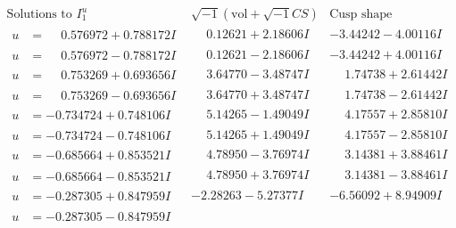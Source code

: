 \documentclass[1p]{elsarticle_modified}
\theoremstyle{definition}
\newcommand{\I}{\sqrt{-1}}
\begin{document}
$$\begin{array}{c|c|c}  
\text{Solutions to }I^u_{1}& \I (\text{vol} + \sqrt{-1}CS) & \text{Cusp shape}\\
 \hline 
\begin{aligned}
u &= \phantom{-}0.576972 + 0.788172 I\end{aligned}
 & \phantom{-}0.12621 + 2.18606 I & -3.44242 - 4.00116 I \\ \hline\begin{aligned}
u &= \phantom{-}0.576972 - 0.788172 I\end{aligned}
 & \phantom{-}0.12621 - 2.18606 I & -3.44242 + 4.00116 I \\ \hline\begin{aligned}
u &= \phantom{-}0.753269 + 0.693656 I\end{aligned}
 & \phantom{-}3.64770 - 3.48747 I & \phantom{-}1.74738 + 2.61442 I \\ \hline\begin{aligned}
u &= \phantom{-}0.753269 - 0.693656 I\end{aligned}
 & \phantom{-}3.64770 + 3.48747 I & \phantom{-}1.74738 - 2.61442 I \\ \hline\begin{aligned}
u &= -0.734724 + 0.748106 I\end{aligned}
 & \phantom{-}5.14265 - 1.49049 I & \phantom{-}4.17557 + 2.85810 I \\ \hline\begin{aligned}
u &= -0.734724 - 0.748106 I\end{aligned}
 & \phantom{-}5.14265 + 1.49049 I & \phantom{-}4.17557 - 2.85810 I \\ \hline\begin{aligned}
u &= -0.685664 + 0.853521 I\end{aligned}
 & \phantom{-}4.78950 - 3.76974 I & \phantom{-}3.14381 + 3.88461 I \\ \hline\begin{aligned}
u &= -0.685664 - 0.853521 I\end{aligned}
 & \phantom{-}4.78950 + 3.76974 I & \phantom{-}3.14381 - 3.88461 I \\ \hline\begin{aligned}
u &= -0.287305 + 0.847959 I\end{aligned}
 & -2.28263 - 5.27377 I & -6.56092 + 8.94909 I \\ \hline\begin{aligned}
u &= -0.287305 - 0.847959 I\end{aligned}

\end{array}$$
\end{document}
